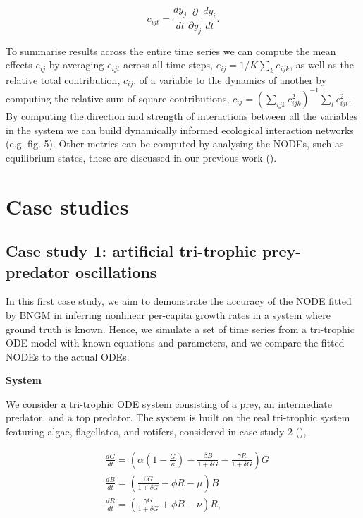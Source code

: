 \documentclass[11pt, oneside]{article}
\begin{document}
\vspace{-0.5cm}
\begin{equation}
    c_{ijt} = \frac{dy_j}{dt} \frac{\partial}{\partial y_j} \frac{dy_i}{dt}.
\end{equation}

To summarise results across the entire time series we can compute the mean effects $e_{ij}$ by averaging $e_{ijt}$ across all time steps, $e_{ij} = 1/K \sum_k e_{ijk}$, as well as the relative total contribution, $c_{ij}$, of a variable to the dynamics of another by computing the relative sum of square contributions, $c_{ij} = \left( \sum_{ijk} c_{ijk}^{2} \right)^{-1} \sum_t c_{ijt}^2$. 
By computing the direction and strength of interactions between all the variables in the system we can build dynamically informed ecological interaction networks (e.g. fig. 5).
Other metrics can be computed by analysing the NODEs, such as equilibrium states, these are discussed in our previous work (\cite{Bonnaffe2021a}). 

\section{Case studies}

\subsection{Case study 1: artificial tri-trophic prey-predator oscillations}

In this first case study, we aim to demonstrate the accuracy of the NODE fitted by BNGM in inferring nonlinear per-capita growth rates in a system where ground truth is known.
Hence, we simulate a set of time series from a tri-trophic ODE model with known equations and parameters, and we compare the fitted NODEs to the actual ODEs.

\textbf{System}

We consider a tri-trophic ODE system consisting of a prey, an intermediate predator, and a top predator.
The system is built on the real tri-trophic system featuring algae, flagellates, and rotifers, considered in case study 2 (\cite{Hiltunen2013}),

\vspace{-0.5cm}
\begin{equation} \begin{aligned}
    & \frac{dG}{dt} = \left( \alpha \left(1-\frac{G}{\kappa}\right) - \frac{\beta B}{1+\delta G} - \frac{\gamma R}{1+\delta G} \right) G\\
    & \frac{dB}{dt} = \left( \frac{\beta G}{1+\delta G} - \phi R - \mu \right) B \\
	& \frac{dR}{dt} = \left( \frac{\gamma G}{1+\delta G} + \phi B - \nu \right) R,
\end{aligned} \end{equation}
\end{document}
